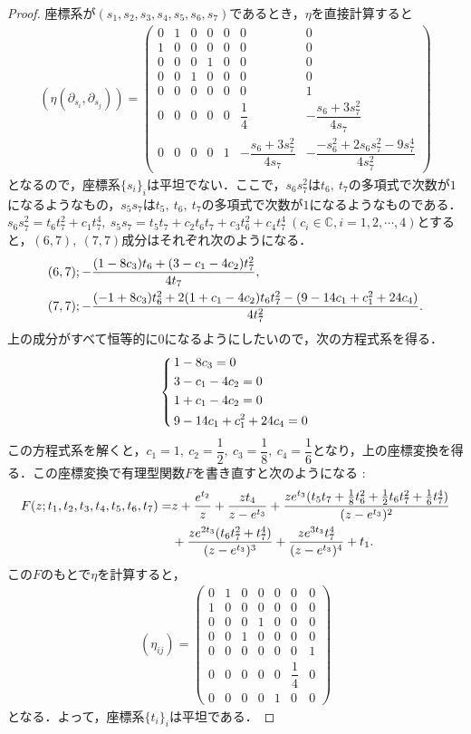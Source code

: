 \documentclass[a4paper,11pt]{jbook}
\theoremstyle{plain}
\theoremstyle{definition}
\theoremstyle{remark}
\theoremstyle{proof}
\numberwithin{equation}{section}
\def\CC{{\mathbb C}}
\begin{document}
\begin{proof}
座標系が$(s_1,s_2,s_3,s_4,s_5,s_6,s_7)$であるとき，$\eta$を直接計算すると
\begin{align}
(\eta(\partial_{s_i},\partial_{s_j}))=
\begin{pmatrix}
0&1&0&0&0&0&0\\
1&0&0&0&0&0&0\\
0&0&0&1&0&0&0\\
0&0&1&0&0&0&0\\
0&0&0&0&0&0&1\\
0&0&0&0&0&\dfrac{1}{4}&-\dfrac{s_6+3s_7^2}{4s_7}\\
0&0&0&0&1&-\dfrac{s_6+3s_7^2}{4s_7}&-\dfrac{-s_6^2+2s_6s_7^2-9s_7^4}{4s_7^2}
\end{pmatrix}
\end{align}
となるので，座標系$\{s_i\}_i$は平坦でない．ここで，$s_6s_7^2$は$t_6, \ t_7$の多項式で次数が$1$になるようなもの，$s_5s_7$は$t_5, \ t_6, \ t_7$の多項式で次数が$1$になるようなものである．$s_6s_7^2=t_6t_7^2 + c_1t_7^4, \ s_5s_7=t_5t_7 + c_2t_6t_7 +c_3t_6^2 + c_4t_7^4\ (c_i \in \CC, i=1,2,\cdots, 4)$とすると，$(6,7), \ (7,7)$成分はそれぞれ次のようになる．
\begin{align}
&(6,7) ; -\frac{(1-8c_3)t_6 + (3-c_1-4c_2)t_7^2}{4t_7}, \notag \\
&(7,7) ; -\frac{(-1+8c_3)t_6^2 + 2(1+c_1-4c_2)t_6t_7^2-(9-14c_1+c_1^2+24c_4)}{4t_7^2}. \notag
\end{align}
上の成分がすべて恒等的に$0$になるようにしたいので，次の方程式系を得る．
\begin{equation}
\left\{ \,
\begin{aligned}
	&1-8c_3=0 \\
	&3-c_1-4c_2=0 \\
	&1+c_1-4c_2=0 \\
	&9-14c_1+c_1^2+24c_4=0
\end{aligned}\notag
\right.
\end{equation}
この方程式系を解くと，$c_1=1,\ c_2=\dfrac{1}{2},\ c_3=\dfrac{1}{8}, \ c_4=\dfrac{1}{6}$となり，上の座標変換を得る．この座標変換で有理型関数$F$を書き直すと次のようになる : 
\begin{align}
F(z;t_1,t_2,t_3,t_4,t_5,t_6,t_7)=&z+\dfrac{e^{t_2}}{z}+\dfrac{zt_4}{z-e^{t_3}}+\dfrac{ze^{t_3}(t_5t_7+\frac{1}{8}t_6^2+\frac{1}{2}t_6t_7^2+\frac{1}{6}t_7^4)}{(z-e^{t_3})^2} \notag \\
&+\dfrac{ze^{2t_3}(t_6t_7^2+t_7^4)}{(z-e^{t_3})^3}+\dfrac{ze^{3t_3}t_7^4}{(z-e^{t_3})^4}+t_1.
\end{align}
この$F$のもとで$\eta$を計算すると，
\begin{align}
(\eta_{ij})=
\begin{pmatrix}
0&1&0&0&0&0&0\\
1&0&0&0&0&0&0\\
0&0&0&1&0&0&0\\
0&0&1&0&0&0&0\\
0&0&0&0&0&0&1\\
0&0&0&0&0&\dfrac{1}{4}&0\\
0&0&0&0&1&0&0
\end{pmatrix}
\end{align}
となる．よって，座標系$\{t_i\}_i$は平坦である．
\end{proof}
\end{document}
